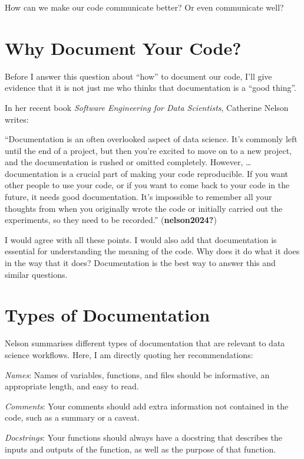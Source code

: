 \documentclass[
  letterpaper,
  DIV=11,
  numbers=noendperiod]{scrartcl}
\begin{document}
How can we make our code communicate better? Or even communicate well?

\section{Why Document Your Code?}\label{why-document-your-code}

Before I answer this question about ``how'' to document our code, I'll
give evidence that it is not just me who thinks that documentation is a
``good thing''.

In her recent book \emph{Software Engineering for Data Scientists},
Catherine Nelson writes:

``Documentation is an often overlooked aspect of data science. It's
commonly left until the end of a project, but then you're excited to
move on to a new project, and the documentation is rushed or omitted
completely. However, \ldots{} documentation is a crucial part of making
your code reproducible. If you want other people to use your code, or if
you want to come back to your code in the future, it needs good
documentation. It's impossible to remember all your thoughts from when
you originally wrote the code or initially carried out the experiments,
so they need to be recorded.'' (\textbf{nelson2024?})

I would agree with all these points. I would also add that documentation
is essential for understanding the meaning of the code. Why does it do
what it does in the way that it does? Documentation is the best way to
answer this and similar questions.

\section{Types of Documentation}\label{types-of-documentation}

Nelson summarises different types of documentation that are relevant to
data science workflows. Here, I am directly quoting her recommendations:

\emph{Names}: Names of variables, functions, and files should be
informative, an appropriate length, and easy to read.

\emph{Comments}: Your comments should add extra information not
contained in the code, such as a summary or a caveat.

\emph{Docstrings}: Your functions should always have a docstring that
describes the inputs and outputs of the function, as well as the purpose
of that function.
\end{document}
